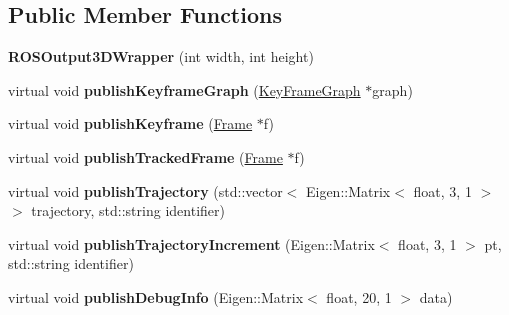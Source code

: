 \subsection*{Public Member Functions}
\begin{DoxyCompactItemize}
\item 
\hypertarget{classlsd__slam_1_1_r_o_s_output3_d_wrapper_a1b499d3c51fd2e9fb83880d7b1f7afd4}{{\bfseries R\-O\-S\-Output3\-D\-Wrapper} (int width, int height)}\label{classlsd__slam_1_1_r_o_s_output3_d_wrapper_a1b499d3c51fd2e9fb83880d7b1f7afd4}

\item 
\hypertarget{classlsd__slam_1_1_r_o_s_output3_d_wrapper_ae67d180442d8a24b8f3394ca236f3b72}{virtual void {\bfseries publish\-Keyframe\-Graph} (\hyperlink{classlsd__slam_1_1_key_frame_graph}{Key\-Frame\-Graph} $\ast$graph)}\label{classlsd__slam_1_1_r_o_s_output3_d_wrapper_ae67d180442d8a24b8f3394ca236f3b72}

\item 
\hypertarget{classlsd__slam_1_1_r_o_s_output3_d_wrapper_a19b724e2f3561a3bcd37809da33711a3}{virtual void {\bfseries publish\-Keyframe} (\hyperlink{classlsd__slam_1_1_frame}{Frame} $\ast$f)}\label{classlsd__slam_1_1_r_o_s_output3_d_wrapper_a19b724e2f3561a3bcd37809da33711a3}

\item 
\hypertarget{classlsd__slam_1_1_r_o_s_output3_d_wrapper_aa5144ddbec893f84408c74f01e7d9eff}{virtual void {\bfseries publish\-Tracked\-Frame} (\hyperlink{classlsd__slam_1_1_frame}{Frame} $\ast$f)}\label{classlsd__slam_1_1_r_o_s_output3_d_wrapper_aa5144ddbec893f84408c74f01e7d9eff}

\item 
\hypertarget{classlsd__slam_1_1_r_o_s_output3_d_wrapper_a015b676f34b19c67317470c2b976f4e9}{virtual void {\bfseries publish\-Trajectory} (std\-::vector$<$ Eigen\-::\-Matrix$<$ float, 3, 1 $>$$>$ trajectory, std\-::string identifier)}\label{classlsd__slam_1_1_r_o_s_output3_d_wrapper_a015b676f34b19c67317470c2b976f4e9}

\item 
\hypertarget{classlsd__slam_1_1_r_o_s_output3_d_wrapper_ad272713c3de1bf15fbbb7c453984d548}{virtual void {\bfseries publish\-Trajectory\-Increment} (Eigen\-::\-Matrix$<$ float, 3, 1 $>$ pt, std\-::string identifier)}\label{classlsd__slam_1_1_r_o_s_output3_d_wrapper_ad272713c3de1bf15fbbb7c453984d548}

\item 
\hypertarget{classlsd__slam_1_1_r_o_s_output3_d_wrapper_a9da72eca1e8b623c65bd647d0f7c3a73}{virtual void {\bfseries publish\-Debug\-Info} (Eigen\-::\-Matrix$<$ float, 20, 1 $>$ data)}\label{classlsd__slam_1_1_r_o_s_output3_d_wrapper_a9da72eca1e8b623c65bd647d0f7c3a73}

\end{DoxyCompactItemize}
